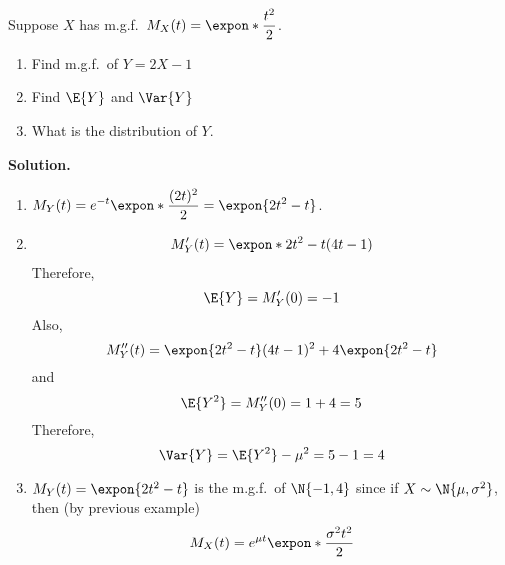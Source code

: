 \begin{Example}{}{}
    Suppose $ X $ has m.g.f.\ $ \displaystyle  M_X(t)=\expon*{\frac{t^2}{2}} $.
    \begin{enumerate}[label=(\roman*)]
        \item Find m.g.f.\ of $ Y=2X-1 $
        \item Find $ \E{Y} $ and $ \Var{Y} $
        \item What is the distribution of $ Y $.
    \end{enumerate}

    \textbf{Solution.}
    \begin{enumerate}[label=(\roman*)]
        \item $ \displaystyle  M_Y(t)=e^{-t}\expon*{\frac{(2t)^2}{2}}=
                  \expon{2t^2-t} $.

        \item \begin{align*}
                  M^\prime_Y(t)=\expon*{2t^2-t}(4t-1)
              \end{align*}
              Therefore,
              \[ \E{Y}=M^\prime_Y(0)=-1 \]
              Also,
              \[ M^{\prime\prime}_Y(t)=\expon{2t^2-t}(4t-1)^2+4
                  \expon{2t^2-t} \]
              and
              \[ \E{Y^2}=M_Y^{\prime\prime}(0)=1+4=5 \]
              Therefore,
              \[ \Var{Y}=\E{Y^2}-\mu^2=5-1=4 \]
        \item $ M_Y(t)=\expon{2t^2-t} $ is the m.g.f.\
              of $ \N{-1,4} $ since
              if $ X \sim \N{\mu,\sigma^2} $, then (by previous example)
              \[ M_X(t)=e^{\mu t}\expon*{\frac{\sigma^2 t^2}{2} } \]
    \end{enumerate}
\end{Example}
